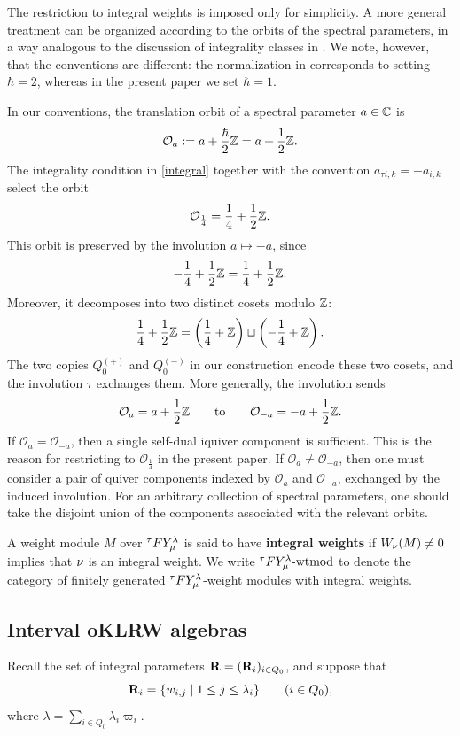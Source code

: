 \begin{remark}
The restriction to integral weights is imposed only for simplicity. A more
general treatment can be organized according to the orbits of the spectral
parameters, in a way analogous to the discussion of integrality classes in
\cite[\S 5.6]{KTWWY19}. We note, however, that the conventions are different:
the normalization in \cite{KTWWY19} corresponds to setting \(\hbar=2\),
whereas in the present paper we set \(\hbar=1\).

In our conventions, the translation orbit of a spectral parameter \(a\in\mathbb{C}\)
is
\[
   \mathcal O_a
   :=
   a+\frac{\hbar}{2}\mathbb{Z}
   =
   a+\frac12\mathbb{Z}.
\]
The integrality condition in \eqref{integral} together with the convention
$a_{\tau i,k}=-a_{i,k}$ select the orbit
\[
   \mathcal O_{\frac14}
   =
   \frac14+\frac12\mathbb{Z}.
\]
This orbit is preserved by the involution \(a\mapsto -a\), since
\[
   -\frac14+\frac12\mathbb{Z}
   =
   \frac14+\frac12\mathbb{Z}.
\]
Moreover, it decomposes into two distinct cosets modulo \(\mathbb{Z}\):
\[
   \frac14+\frac12\mathbb{Z}
   =
   \left(\frac14+\mathbb{Z}\right)
   \sqcup
   \left(-\frac14+\mathbb{Z}\right).
\]
The two copies \(Q_0^{(+)}\) and \(Q_0^{(-)}\) in our construction encode
these two cosets, and the involution \(\tau\) exchanges them. More generally, the involution sends
\[
   \mathcal O_a
   =
   a+\frac12\mathbb{Z}
   \qquad\text{to}\qquad
   \mathcal O_{-a}
   =
   -a+\frac12\mathbb{Z}.
\]
If \(\mathcal O_a=\mathcal O_{-a}\), then a single self-dual iquiver component
is sufficient. This is the reason for restricting to
\(\mathcal O_{\frac14}\) in the present paper. If
\(\mathcal O_a\neq\mathcal O_{-a}\), then one must consider a pair of quiver
components indexed by \(\mathcal O_a\) and \(\mathcal O_{-a}\), exchanged by
the induced involution. For an arbitrary collection of spectral parameters,
one should take the disjoint union of the components associated with the
relevant orbits.
\end{remark}




A weight module $M$ over ${}^\tau F Y_\mu^\lambda$ is said to have \textbf{integral weights} if
\(
W_{\mathbf{\nu}}(M)\neq 0
\)
implies that $\mathbf{\nu}$ is an integral weight.  
We write ${}^\tau F Y_\mu^\lambda\text{-wtmod}$ to denote the category of finitely generated ${}^\tau F Y_\mu^\lambda$-weight modules with integral weights.

\subsection{Interval oKLRW algebras}
Recall the set of integral parameters $\mathbf{R}=(\mathbf{R}_i)_{i\in Q_0}$, and suppose that
\[
\mathbf{R}_i=\{w_{i,j}\mid 1\le j\le \lambda_i\}
\qquad (i\in Q_0),
\]
where
\(
\lambda=\sum_{i\in Q_0}\lambda_i\varpi_i.
\)


